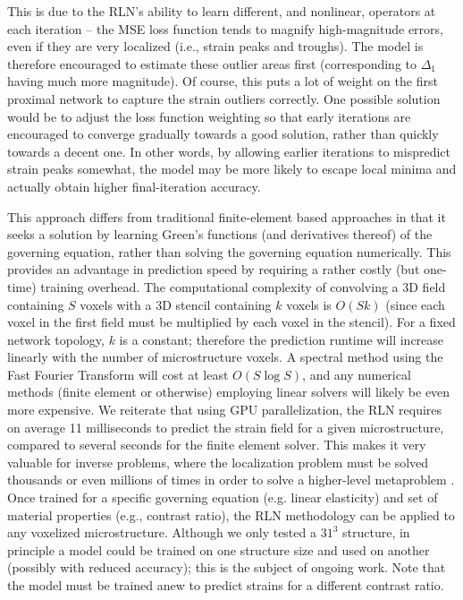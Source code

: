 \documentclass[3p, preprint]{elsarticle}
\newenvironment{revision} {} {}
\begin{document}
This is due to the RLN's ability to learn different,  \begin{revision}and nonlinear,\end{revision} operators at each iteration -- the MSE loss function tends to magnify high-magnitude errors, even if they are very localized (i.e., strain peaks and troughs). The model is therefore encouraged to estimate these outlier areas first (corresponding to $\Delta_1$ having much more magnitude). Of course, this puts a lot of weight on the first proximal network to capture the strain outliers correctly. One possible solution would be to adjust the loss function weighting so that early iterations are encouraged to converge gradually towards a good solution, rather than quickly towards a decent one. In other words, by allowing earlier iterations to mispredict strain peaks somewhat, the model may be more likely to escape local minima and actually obtain higher final-iteration accuracy.

\begin {revision} 
This approach differs from traditional finite-element based approaches in that it seeks a solution by learning Green's functions (and derivatives thereof) of the governing equation, rather than solving the governing equation numerically. This provides an advantage in prediction speed by requiring a rather costly (but one-time) training overhead. The computational complexity of convolving a 3D field containing $S$ voxels with a 3D stencil containing $k$ voxels is $O(S k)$ (since each voxel in the first field must be multiplied by each voxel in the stencil). For a fixed network topology, $k$ is a constant; therefore the prediction runtime will increase linearly with the number of microstructure voxels. A spectral method using the Fast Fourier Transform will cost at least $O(S \log S)$, and any numerical methods (finite element or otherwise) employing linear solvers will likely be even more expensive. We reiterate that using GPU parallelization, the RLN requires on average 11 milliseconds to predict the strain field for a given microstructure, compared to several seconds for the finite element solver. This makes it very valuable for inverse problems, where the localization problem must be solved thousands or even millions of times in order to solve a higher-level metaproblem \cite{chen2020}.  Once trained for a specific governing equation (e.g. linear elasticity) and set of material properties (e.g., contrast ratio), the RLN methodology can be applied to any voxelized microstructure. Although we only tested a $31^3$ structure, in principle a model could be trained on one structure size and used on another (possibly with reduced accuracy); this is the subject of ongoing work. Note that the model must be trained anew to predict strains for a different contrast ratio. 
\end{revision}
\end{document}
